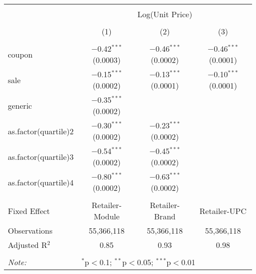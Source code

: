 
\begin{table}[!htbp] \centering 
  \caption{} 
  \label{tab:overallSavings} 
\begin{tabular}{@{\extracolsep{5pt}}lccc} 
\\[-1.8ex]\hline 
\hline \\[-1.8ex] 
 & \multicolumn{3}{c}{Log(Unit Price)} \\ 
\\[-1.8ex] & (1) & (2) & (3)\\ 
\hline \\[-1.8ex] 
 coupon & $-$0.42$^{***}$ (0.0003) & $-$0.46$^{***}$ (0.0002) & $-$0.46$^{***}$ (0.0001) \\ 
  sale & $-$0.15$^{***}$ (0.0002) & $-$0.13$^{***}$ (0.0001) & $-$0.10$^{***}$ (0.0001) \\ 
  generic & $-$0.35$^{***}$ (0.0002) &  &  \\ 
  as.factor(quartile)2 & $-$0.30$^{***}$ (0.0002) & $-$0.23$^{***}$ (0.0002) &  \\ 
  as.factor(quartile)3 & $-$0.54$^{***}$ (0.0002) & $-$0.45$^{***}$ (0.0002) &  \\ 
  as.factor(quartile)4 & $-$0.80$^{***}$ (0.0002) & $-$0.63$^{***}$ (0.0002) &  \\ 
 \hline \\[-1.8ex] 
Fixed Effect & Retailer-Module & Retailer-Brand & Retailer-UPC \\ 
Observations & 55,366,118 & 55,366,118 & 55,366,118 \\ 
Adjusted R$^{2}$ & 0.85 & 0.93 & 0.98 \\ 
\hline 
\hline \\[-1.8ex] 
\textit{Note:}  & \multicolumn{3}{l}{$^{*}$p$<$0.1; $^{**}$p$<$0.05; $^{***}$p$<$0.01} \\ 
\end{tabular} 
\end{table} 
